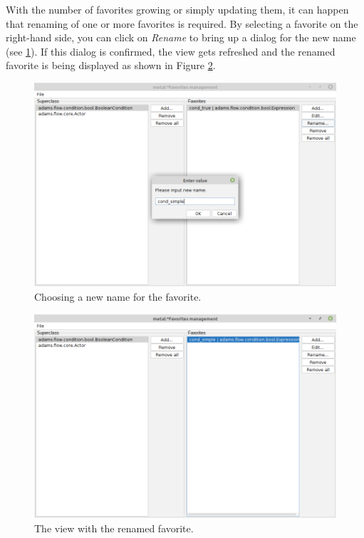 \clearpage
{}
With the number of favorites growing or simply updating them, it can happen
that renaming of one or more favorites is required. By selecting a favorite
on the right-hand side, you can click on \textit{Rename} to bring up a dialog
for the new name (see \ref{favoritesmanagement-rename1}). If this dialog
is confirmed, the view gets refreshed and the renamed favorite is being
displayed as shown in Figure \ref{favoritesmanagement-rename2}.

\begin{figure}[htb]
  \centering
  \includegraphics[width=12.0cm]{images/favoritesmanagement-rename1.png}
  \caption{Choosing a new name for the favorite.}
  \label{favoritesmanagement-rename1}
\end{figure}

\begin{figure}[htb]
  \centering
  \includegraphics[width=12.0cm]{images/favoritesmanagement-rename2.png}
  \caption{The view with the renamed favorite.}
  \label{favoritesmanagement-rename2}
\end{figure}

